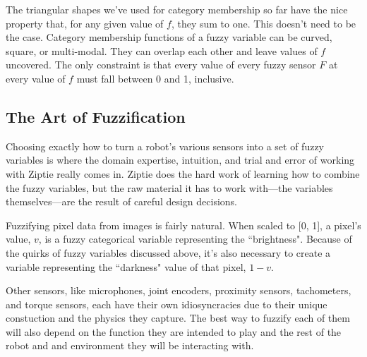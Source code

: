 The triangular shapes we've used for category membership so far have 
the nice property that, for any given value of $f$, they sum to one.
This doesn't need to be the case. Category membership functions of
a fuzzy variable can be
curved, square, or multi-modal. They can overlap each other and
leave values of $f$ uncovered. The only constraint is that every value
of every fuzzy sensor $F$ at every value of $f$ must fall
between 0 and 1, inclusive.

\subsection{The Art of Fuzzification}
\label{subsec:fuzzyart}

Choosing exactly how to turn a robot's various sensors into a set of
fuzzy variables is where the domain expertise, intuition, and trial and
error of working with Ziptie really comes in. Ziptie does the hard work
of learning how to combine the fuzzy variables, but the raw material it
has to work with---the variables themselves---are the result of careful
design decisions.

Fuzzifying pixel data from images is fairly natural.
When scaled to [0, 1], a pixel's value, $v$,
is a fuzzy categorical variable representing the ``brightness".
Because of the quirks of fuzzy variables discussed above,
it's also necessary to create a variable
representing the ``darkness" value of that pixel, $1 - v$.

Other sensors, like microphones, joint encoders, proximity sensors,
tachometers, and torque sensors, each have their own idiosyncracies
due to their unique constuction and the physics they capture.
The best way to fuzzify each of them will also depend on the function
they are intended to play and the rest of the robot and and environment
they will be interacting with.
